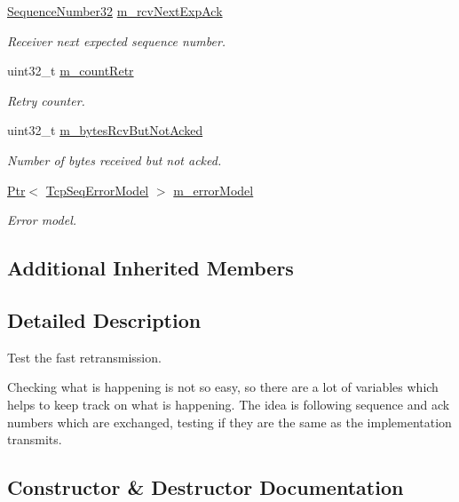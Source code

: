 \begin{DoxyCompactItemize}
\hyperlink{group__network_gacb2070e4e98d2d5135c9bede58f07a03}{Sequence\+Number32} \hyperlink{classTcpFastRetrTest_ab78190a49235a31ec165a895df9ddbaf}{m\+\_\+rcv\+Next\+Exp\+Ack}
\begin{DoxyCompactList}\small\item\em Receiver next expected sequence number. \end{DoxyCompactList}\item 
uint32\+\_\+t \hyperlink{classTcpFastRetrTest_a8b7da51cca3cf7f9113f81de4b0ec680}{m\+\_\+count\+Retr}
\begin{DoxyCompactList}\small\item\em Retry counter. \end{DoxyCompactList}\item 
uint32\+\_\+t \hyperlink{classTcpFastRetrTest_acd14a67f45942f32812bb3f81c684fca}{m\+\_\+bytes\+Rcv\+But\+Not\+Acked}
\begin{DoxyCompactList}\small\item\em Number of bytes received but not acked. \end{DoxyCompactList}\item 
\hyperlink{classns3_1_1Ptr}{Ptr}$<$ \hyperlink{classns3_1_1TcpSeqErrorModel}{Tcp\+Seq\+Error\+Model} $>$ \hyperlink{classTcpFastRetrTest_a8b673b34b4afa04ffe078cf14c1dec09}{m\+\_\+error\+Model}
\begin{DoxyCompactList}\small\item\em Error model. \end{DoxyCompactList}\end{DoxyCompactItemize}
\subsection*{Additional Inherited Members}


\subsection{Detailed Description}
Test the fast retransmission. 

Checking what is happening is not so easy, so there are a lot of variables which helps to keep track on what is happening. The idea is following sequence and ack numbers which are exchanged, testing if they are the same as the implementation transmits. 

\subsection{Constructor \& Destructor Documentation}
